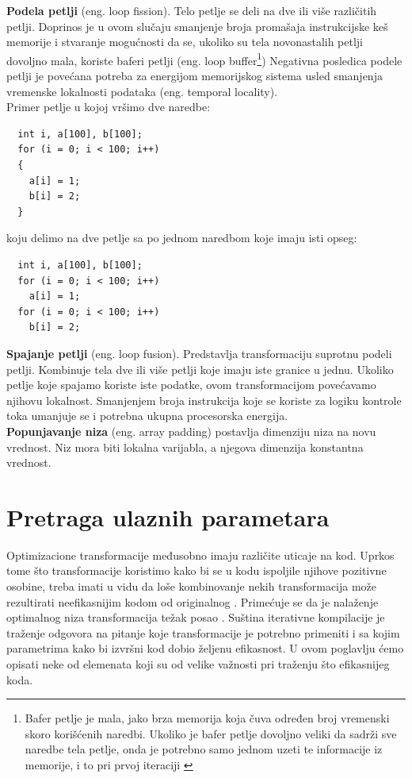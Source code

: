 \documentclass[a4paper]{article}
\begin{document}
\textbf{Podela petlji} (eng. loop fission). Telo petlje se deli na dve ili više različitih petlji. 
Doprinos je u ovom slučaju smanjenje broja promašaja instrukcijske keš memorije i stvaranje mogućnosti da se, 
ukoliko su tela novonastalih petlji dovoljno mala, 
koriste baferi petlji (eng. loop buffer\footnote{Bafer petlje je mala, jako brza memorija koja čuva određen broj vremenski skoro korišćenih naredbi. Ukoliko je bafer petlje dovoljno veliki da sadrži sve naredbe tela petlje, onda je potrebno samo jednom uzeti te informacije iz memorije, i to pri prvoj iteraciji \cite{stallings2000computer}}) Negativna posledica podele petlji je povećana potreba za energijom memorijskog sistema usled smanjenja vremenske lokalnosti podataka (eng. temporal locality).\\
Primer petlje u kojoj vršimo dve naredbe:
\begin{lstlisting}
  int i, a[100], b[100];
  for (i = 0; i < 100; i++)
  {
    a[i] = 1; 
    b[i] = 2;
  }
\end{lstlisting}
koju delimo na dve petlje sa po jednom naredbom koje imaju isti opseg:
\begin{lstlisting}
  int i, a[100], b[100];
  for (i = 0; i < 100; i++)
    a[i] = 1;                     
  for (i = 0; i < 100; i++)
    b[i] = 2;
\end{lstlisting}

\textbf{Spajanje petlji} (eng. loop fusion). Predstavlja transformaciju suprotnu podeli petlji. Kombinuje tela dve ili više petlji koje imaju iste
granice u jednu. Ukoliko petlje koje spajamo koriste iste podatke, ovom transformacijom povećavamo
njihovu lokalnost. Smanjenjem broja instrukcija koje se koriste za logiku kontrole toka umanjuje se 
i potrebna ukupna procesorska energija.\\

\textbf{Popunjavanje niza} (eng. array padding) postavlja dimenziju niza na novu vrednost. Niz mora biti lokalna varijabla, a njegova dimenzija konstantna vrednost.

\section{Pretraga ulaznih parametara}
\label{sec:pretraga}
Optimizacione transformacije međusobno imaju različite uticaje na kod. 
Uprkos tome što transformacije koristimo kako bi se u kodu ispoljile njihove pozitivne osobine, 
treba imati u vidu da loše kombinovanje nekih transformacija može rezultirati neefikasnijim kodom od originalnog \cite{kisuki2000iterative}. 
Primećuje se da je nalaženje optimalnog niza transformacija težak posao \cite{Fursin2005}. Suština iterativne kompilacije
je traženje odgovora na pitanje koje transformacije je potrebno primeniti i sa kojim parametrima kako bi 
izvršni kod dobio željenu efikasnost. U ovom poglavlju ćemo opisati neke od elemenata koji su od velike važnosti pri traženju što efikasnijeg koda.
\end{document}
